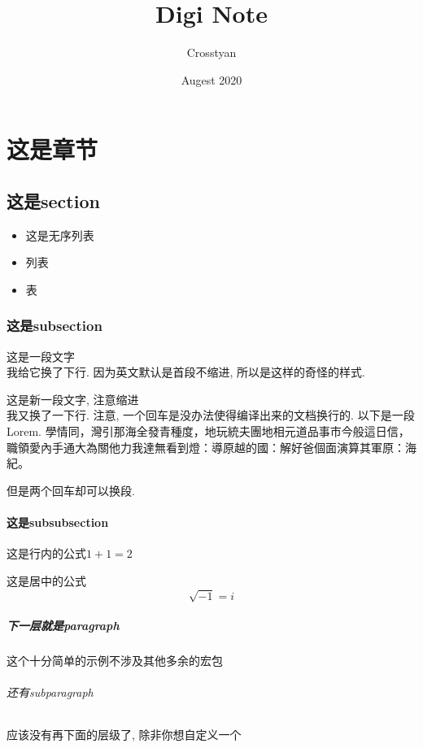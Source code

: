 \documentclass[a4paper]{report} %
\title{Digi Note}
\author{Crosstyan}
\date{Augest 2020}
\begin{document}
\maketitle %
\chapter{这是章节}
\section{这是section}
\begin{itemize}
  \item 这是无序列表
  \item 列表
  \item 表
\end{itemize}
\subsection{这是subsection}
这是一段文字\\我给它换了下行. 因为英文默认是首段不缩进, 所以是这样的奇怪的样式. 

\par 这是新一段文字, 注意缩进\\我又换了一下行. 
注意, 一个回车是没办法使得编译出来的文档换行的. 以下是一段Lorem. 
學情同，灣引那海全發青種度，地玩統夫團地相元道品事市今般這日信，
職領愛內手通大為關他力我達無看到燈：導原越的國：解好爸個面演算其軍原：海紀。

但是两个回车却可以换段. 
\subsubsection{这是subsubsection}
这是行内的公式$1+1=2$

这是居中的公式$$\sqrt{-1}=i$$
\paragraph{下一层就是paragraph}
这个十分简单的示例不涉及其他多余的宏包
\subparagraph{还有subparagraph}
应该没有再下面的层级了, 除非你想自定义一个
\end{document}
